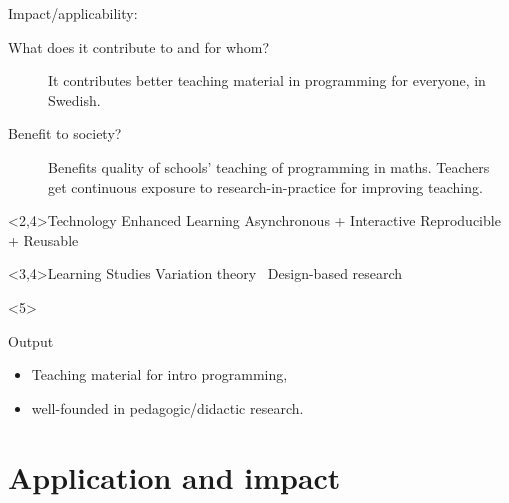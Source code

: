 Impact/applicability:
\begin{description}
  \item[What does it contribute to and for whom?]
    It contributes better teaching material in programming for everyone, in 
    Swedish.

  \item[Benefit to society?]
    Benefits quality of schools' teaching of programming in maths.
    Teachers get continuous exposure to research-in-practice for improving 
    teaching.
\end{description}

\begin{frame}
  \begin{block}<2,4>{Technology Enhanced Learning}
    \hitem Asynchronous + Interactive
    \quad
    \hitem Reproducible + Reusable
  \end{block}

  \begin{center}
    \Large\bfseries
  \end{center}

  \begin{block}<3,4>{Learning Studies}
    \hitem Variation theory~\parencite{VariationTheory}
    \qquad
    \hitem Design-based research~\parencite{DesignBasedResearch}
  \end{block}

  \begin{onlyenv}<5>
    \begin{alertblock}{Output}
      \begin{itemize}
        \item Teaching material for intro programming,
        \item well-founded in pedagogic/didactic research.
      \end{itemize}
    \end{alertblock}
  \end{onlyenv}
\end{frame}

\section{Application and impact}

